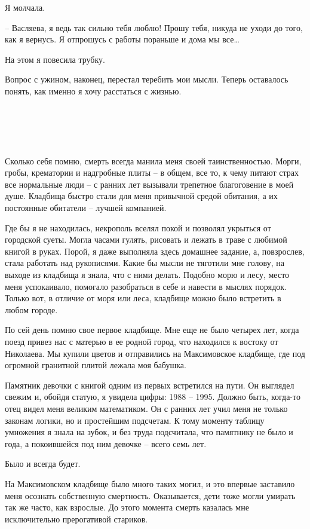 \documentclass[
]{book}
\begin{document}
Я молчала.

-- Васляева, я ведь так сильно тебя люблю! Прошу тебя, никуда не уходи до того, как я вернусь. Я отпрошусь с работы пораньше и дома мы все\ldots{}

На этом я повесила трубку.

Вопрос с ужином, наконец, перестал теребить мои мысли. Теперь оставалось понять, как именно я хочу расстаться с жизнью.

\hypertarget{chapter-75}{%
\chapter{~}\label{chapter-75}}

Сколько себя помню, смерть всегда манила меня своей таинственностью. Морги, гробы, крематории и надгробные плиты -- в общем, все то, к чему питают страх все нормальные люди -- с ранних лет вызывали трепетное благоговение в моей душе. Кладбища быстро стали для меня привычной средой обитания, а их постоянные обитатели -- лучшей компанией.

Где бы я не находилась, некрополь вселял покой и позволял укрыться от городской суеты. Могла часами гулять, рисовать и лежать в траве с любимой книгой в руках. Порой, я даже выполняла здесь домашнее задание, а, повзрослев, стала работать над рукописями. Какие бы мысли не тяготили мне голову, на выходе из кладбища я знала, что с ними делать. Подобно морю и лесу, место меня успокаивало, помогало разобраться в себе и навести в мыслях порядок. Только вот, в отличие от моря или леса, кладбище можно было встретить в любом городе.

По сей день помню свое первое кладбище. Мне еще не было четырех лет, когда поезд привез нас с матерью в ее родной город, что находился к востоку от Николаева. Мы купили цветов и отправились на Максимовское кладбище, где под огромной гранитной плитой лежала моя бабушка.

Памятник девочки с книгой одним из первых встретился на пути. Он выглядел свежим и, обойдя статую, я увидела цифры: 1988 -- 1995. Должно быть, когда-то отец видел меня великим математиком. Он с ранних лет учил меня не только законам логики, но и простейшим подсчетам. К тому моменту таблицу умножения я знала на зубок, и без труда подсчитала, что памятнику не было и года, а покоившейся под ним девочке -- всего семь лет.

Было и всегда будет.

На Максимовском кладбище было много таких могил, и это впервые заставило меня осознать собственную смертность. Оказывается, дети тоже могли умирать так же часто, как взрослые. До этого момента смерть казалась мне исключительно прерогативой стариков.
\end{document}
